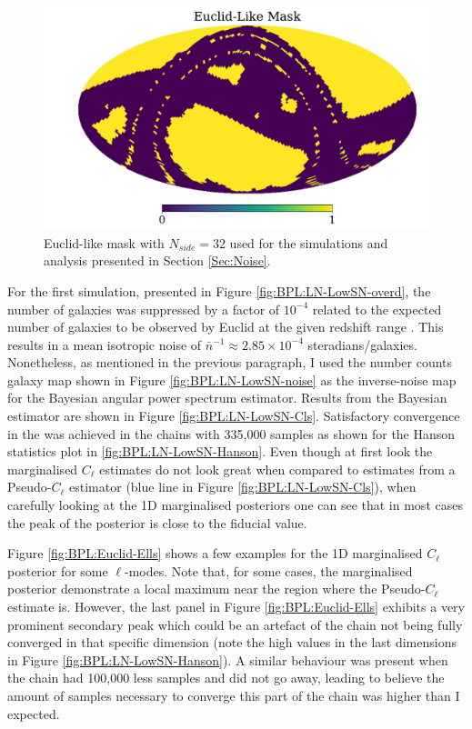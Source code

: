 \begin{figure}
\begin{center}
\includegraphics[scale=0.40]{BPL-FIGS/Euclid-Foot-N32.pdf}
\caption[Euclid-like mask with $N_{side} = 32$]{Euclid-like mask with $N_{side} = 32$ used for the simulations and analysis presented in Section \ref{Sec:Noise}.}
\label{fig:BPL:EuclidMask}
\end{center}
\end{figure}

\qquad For the first simulation, presented in Figure \ref{fig:BPL:LN-LowSN-overd}, the number of galaxies was suppressed by a factor of $10^{-4}$ related to the expected number of galaxies to be observed by Euclid at the given redshift range \citep{2011EuclidRedPaper}. This results in a mean isotropic noise of $\bar{n}^{-1}\approx 2.85\times 10^{-4}$ steradians/galaxies. Nonetheless, as mentioned in the previous paragraph, I used the number counts galaxy map shown in Figure \ref{fig:BPL:LN-LowSN-noise} as the inverse-noise map for the Bayesian angular power spectrum estimator. Results from the Bayesian estimator are shown in Figure \ref{fig:BPL:LN-LowSN-Cls}. Satisfactory convergence in the was achieved in the chains with 335,000 samples as shown for the Hanson statistics plot in \ref{fig:BPL:LN-LowSN-Hanson}. Even though at first look the marginalised $C_{\ell}$ estimates do not look great when compared to estimates from a Pseudo-$C_{\ell}$ estimator (blue line in Figure \ref{fig:BPL:LN-LowSN-Cls}), when carefully looking at the 1D marginalised posteriors one can see that in most cases the peak of the posterior is close to the fiducial value. 

\qquad Figure \ref{fig:BPL:Euclid-Ells} shows a few examples for the 1D marginalised $C_{\ell}$ posterior for some $\ell$-modes. Note that, for some cases, the marginalised posterior demonstrate a local maximum near the region where the Pseudo-$C_{\ell}$ estimate is. However, the last panel in Figure \ref{fig:BPL:Euclid-Ells} exhibits a very prominent secondary peak which could be an artefact of the chain not being fully converged in that specific dimension (note the high values in the last dimensions in Figure \ref{fig:BPL:LN-LowSN-Hanson}). A similar behaviour was present when the chain had 100,000 less samples and did not go away, leading to believe the amount of samples necessary to converge this part of the chain was higher than I expected.


